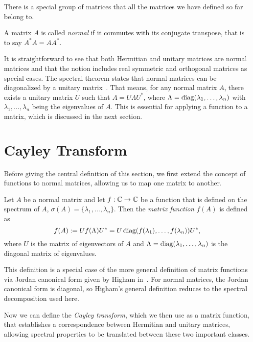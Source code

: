 There is a special group of matrices that all the matrices we have defined so far belong to.

\begin{definition}
    A matrix $A$ is called \emph{normal} if it commutes with its conjugate transpose,
    that is to say $A^* A = A A^*$.
\end{definition}

It is straightforward to see that both Hermitian and unitary matrices are normal matrices and that the notion includes real symmetric and orthogonal matrices as special cases. The spectral theorem states that normal matrices can be diagonalized by a unitary matrix~\cite[Thm.~7.24, p.~218]{sheldonaxler}. That means, for any normal matrix $A$, there exists a unitary matrix $U$ such that $A = U \Lambda U^*$, where $\Lambda = \operatorname{diag}(\lambda_1, \ldots, \lambda_n)$ with $\lambda_1, \ldots, \lambda_n$ being the eigenvalues of $A$. This is essential for applying a function to a matrix, which is discussed in the next section.

\section{Cayley Transform}

Before giving the central definition of this section, we first extend the concept of functions to normal matrices, allowing us to map one matrix to another.

\begin{definition} \label{def:matrix_function}
    Let $A$ be a normal matrix and let $f: \mathbb{C} \to \mathbb{C}$ be a function that is defined on the spectrum of $A$,
    $\sigma(A) = \{\lambda_1, \ldots, \lambda_n\}$.
    Then the \emph{matrix function} $f(A)$ is defined as
    \[
    f(A) := U f(\Lambda) U^* = U \operatorname{diag}(f(\lambda_1), \ldots, f(\lambda_n)) U^*,
    \]
    where $U$ is the matrix of eigenvectors of $A$ and $\Lambda = \operatorname{diag}(\lambda_1, \ldots, \lambda_n)$ is the diagonal matrix of eigenvalues.
\end{definition}

This definition is a special case of the more general definition of matrix functions via Jordan canonical form given by Higham in~\cite[p.~3]{higham}. For normal matrices, the Jordan canonical form is diagonal, so Higham’s general definition reduces to the spectral decomposition used here.

Now we can define the \emph{Cayley transform}, which we then use as a matrix function, that establishes a correspondence between Hermitian and unitary matrices, allowing spectral properties to be translated between these two important classes.

